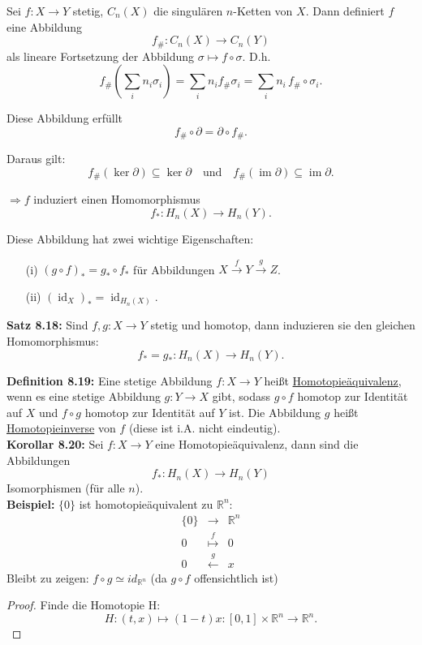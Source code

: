 \documentclass[fleqn, 12pt, letterpaper]{article}
\begin{document}
Sei $f \colon X \to Y$ stetig, $C_n(X)$ die singulären $n$-Ketten von $X$. Dann definiert $f$ eine Abbildung
\[
f_\# \colon C_n(X) \to C_n(Y)
\]
als lineare Fortsetzung der Abbildung $\sigma \mapsto f \circ \sigma$. D.h.
\[
f_\#\left( \sum_i n_i \sigma_i \right) = \sum_i n_i f_\# \sigma_i = \sum_i n_i \, f_\#\circ\sigma_i.
\]

Diese Abbildung erfüllt
\[
f_\# \circ \partial = \partial \circ f_\#.
\]

Daraus gilt:
\[
f_\#(\ker \partial) \subseteq \ker \partial \quad \text{und} \quad f_\#(\operatorname{im} \partial) \subseteq \operatorname{im} \partial.
\]

$\Rightarrow f$ induziert einen {Homomorphismus}
\[
f_* \colon H_n(X) \to H_n(Y).
\]

Diese Abbildung hat zwei wichtige Eigenschaften:

\begin{enumerate}
    \item[(i)] $(g \circ f)_* = g_* \circ f_*$ für Abbildungen $X \xrightarrow{f} Y \xrightarrow{g} Z$.
    \item[(ii)] $(\operatorname{id}_X)_* = \operatorname{id}_{H_n(X)}$.
\end{enumerate}

\textbf{Satz 8.18:}
Sind $f, g \colon X \to Y$ stetig und homotop, dann induzieren sie den gleichen Homomorphismus:
\[
f_* = g_* \colon H_n(X) \to H_n(Y).
\]

\textbf{Definition 8.19:}
Eine stetige Abbildung $f \colon X \to Y$ heißt \underline{Homotopieäquivalenz}, wenn es eine stetige Abbildung $g \colon Y \to X$ gibt, sodass $g\circ f$ homotop zur Identität auf $X$ und $f\circ g$ homotop zur Identität auf $Y$ ist.  
Die Abbildung $g$ heißt \underline{Homotopieinverse} von $f$ (diese ist i.A. nicht eindeutig).\\

\textbf{Korollar 8.20:}
Sei $f \colon X \to Y$ eine Homotopieäquivalenz, dann sind die Abbildungen
\[
f_* \colon H_n(X) \to H_n(Y)
\]
{Isomorphismen} (für alle $n$).\\

\textbf{Beispiel:}
$\{0\}$ ist {homotopieäquivalent} zu $\mathbb{R}^n$:
\[
\begin{array}{ccc}
\{0\} & \longrightarrow & \mathbb{R}^n \\
0 & \overset{f}{\longmapsto} & 0 \\
0 & \overset{g}{\longleftarrow} & x
\end{array}
\]
Bleibt zu zeigen: $f\circ g\simeq id_{\mathbb{R}^n}$ (da $g\circ f$ offensichtlich ist)
\begin{proof}
Finde die Homotopie H:
\[
H:(t, x) \mapsto (1 - t)x \colon [0,1] \times \mathbb{R}^n \to \mathbb{R}^n.
\]
\end{proof} 
\end{document}
